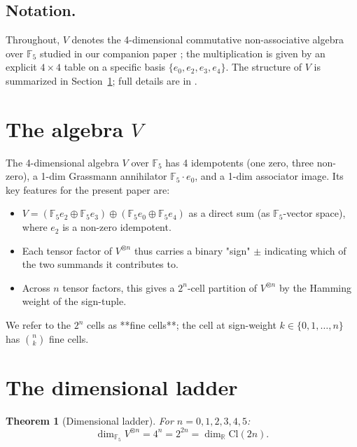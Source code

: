 \documentclass[11pt,reqno]{amsart}
\theoremstyle{plain}
\newtheorem{theorem}{Theorem}[section]
\theoremstyle{definition}
\theoremstyle{remark}
\newcommand{\F}{\mathbb{F}}
\newcommand{\R}{\mathbb{R}}
\newcommand{\Cl}{\mathrm{Cl}}
\begin{document}
\subsection{Notation.}
Throughout, $V$ denotes the 4-dimensional commutative non-associative
algebra over $\F_5$ studied in our companion paper \cite{Sanders2026Dirac};
the multiplication is given by an explicit $4 \times 4$ table on a
specific basis $\{e_0, e_2, e_3, e_4\}$.  The structure of $V$ is
summarized in Section~\ref{sec:V}; full details are in
\cite{Sanders2026Dirac}.

\section{The algebra $V$}
\label{sec:V}

The 4-dimensional algebra $V$ over $\F_5$ has 4 idempotents (one zero, three
non-zero), a 1-dim Grassmann annihilator $\F_5 \cdot e_0$, and a 1-dim
associator image. Its key features for the present paper are:
\begin{itemize}
\item $V = (\F_5 e_2 \oplus \F_5 e_3) \oplus (\F_5 e_0 \oplus \F_5 e_4)$
as a direct sum (as $\F_5$-vector space), where $e_2$ is a non-zero
idempotent.
\item Each tensor factor of $V^{\otimes n}$ thus carries a binary "sign"
$\pm$ indicating which of the two summands it contributes to.
\item Across $n$ tensor factors, this gives a $2^n$-cell partition of
$V^{\otimes n}$ by the Hamming weight of the sign-tuple.
\end{itemize}
We refer to the $2^n$ cells as **fine cells**; the cell at sign-weight
$k \in \{0, 1, \ldots, n\}$ has $\binom{n}{k}$ fine cells.

\section{The dimensional ladder}

\begin{theorem}[Dimensional ladder]\label{thm:ladder}
For $n = 0, 1, 2, 3, 4, 5$:
\[
\dim_{\F_5} V^{\otimes n} = 4^n = 2^{2n} = \dim_\R \Cl(2n).
\]
\end{theorem}
\end{document}
